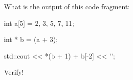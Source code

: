 What is the output of this code fragment:



\begin{consolethree}[escapeinside=||]

int a[5] = {2, 3, 5, 7, 11};

int * b = (a + 3);

std::cout << *(b + 1) + b[-2] << '\n';

\end{consolethree}



Verify!

